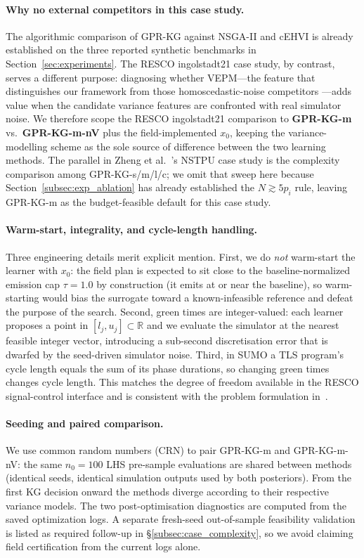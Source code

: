 \documentclass[12pt]{article}
\theoremstyle{plain}
\theoremstyle{definition}
\theoremstyle{remark}
\newcommand{\R}{\mathbb{R}}
\begin{document}
\paragraph{Why no external competitors in this case study.}
The algorithmic comparison of GPR-KG against NSGA-II and cEHVI is
already established on the three reported synthetic benchmarks in
Section~\ref{sec:experiments}.  The RESCO ingolstadt21 case study, by contrast,
serves a different purpose: diagnosing whether VEPM---the feature that
distinguishes our framework from those homoscedastic-noise competitors
---adds value when the candidate variance features are confronted with
real simulator noise.
We therefore scope the RESCO ingolstadt21 comparison to \textbf{GPR-KG-m} vs.\
\textbf{GPR-KG-m-nV} plus the field-implemented $x_{0}$, keeping the
variance-modelling scheme as the sole source of difference between the
two learning methods.  The parallel in
Zheng et al.~\citep{ZhengXueXuRan2019a}'s NSTPU case study is the
complexity comparison among GPR-KG-s/m/l/c; we omit that sweep here
because Section~\ref{subsec:exp_ablation} has already established
the $N\gtrsim 5p_{i}$ rule, leaving GPR-KG-m as the budget-feasible
default for this case study.

\paragraph{Warm-start, integrality, and cycle-length handling.}
Three engineering details merit explicit mention.  First, we do
\emph{not} warm-start the learner with $x_{0}$: the field plan is
expected to sit close to the baseline-normalized emission cap $\tau=1.0$ by
construction (it emits at or near the baseline), so warm-starting
would bias the surrogate toward a known-infeasible reference and
defeat the purpose of the search.  Second, green times are
integer-valued: each learner proposes a point in
$[l_{j},u_{j}]\subset\R$ and we evaluate the simulator at the nearest
feasible integer vector, introducing a sub-second discretisation
error that is dwarfed by the seed-driven simulator noise.  Third, in
SUMO a TLS program's cycle length equals the sum of its phase
durations, so changing green times changes cycle length.  This matches
the degree of freedom available in the RESCO signal-control interface
and is consistent with the problem formulation
in~\citep{ZhengXueXuRan2019a}.

\paragraph{Seeding and paired comparison.}
We use common random numbers (CRN) to pair GPR-KG-m and GPR-KG-m-nV:
the same $n_{0}=100$ LHS pre-sample evaluations are shared between
methods (identical seeds, identical simulation outputs used by both
posteriors).  From the first KG decision onward the methods diverge
according to their respective variance models.  The two
post-optimisation diagnostics are computed from the saved optimization
logs.  A separate fresh-seed out-of-sample feasibility validation is
listed as required follow-up in \S\ref{subsec:case_complexity}, so we
avoid claiming field certification from the current logs alone.
\end{document}
